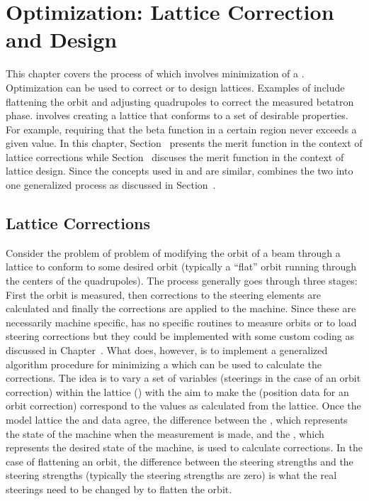 \chapter{Optimization: Lattice Correction and Design}
\label{c:opti}

This chapter covers the process of  which involves minimization of a
. Optimization can be used to correct or to design lattices. Examples of  include flattening the orbit and adjusting quadrupoles to correct the
measured betatron phase.  involves creating a lattice that conforms to
a set of desirable properties. For example, requiring that the beta function in a certain
region never exceeds a given value. In this chapter,
Section~ presents the merit function in the context of lattice
corrections while Section~ discuses the merit function in the
context of lattice design. Since the concepts used in  and
 are similar, \tao combines the two into one generalized process as
discussed in Section~.

\section{Lattice Corrections}
\label{s:lattice.correction}

Consider the problem of problem of modifying the orbit of a beam through a lattice to
conform to some desired orbit (typically a ``flat'' orbit running through the centers of
the quadrupoles). The process generally goes through three stages: First the orbit is
measured, then corrections to the steering elements are calculated and finally the
corrections are applied to the machine. Since these are necessarily machine specific, \tao
has no specific routines to measure orbits or to load steering corrections but they could
be implemented with some custom coding as discussed in Chapter~. What
\tao does, however, is to implement a generalized algorithm procedure for minimizing a
 which can be used to calculate the corrections.  The idea is to vary a
set of variables (steerings in the case of an orbit correction) within the 
lattice () with the aim to make the   (position
data for an orbit correction) correspond to the values as calculated from the 
lattice.  Once the model lattice the  and  data agree, the
difference between the , which represents the state of the machine when the
measurement is made, and the , which represents the desired state of the
machine, is used to calculate corrections. In the case of flattening an orbit, the
difference between the  steering strengths and the  steering
strengths (typically the  steering strengths are zero) is what the real
steerings need to be changed by to flatten the orbit.

